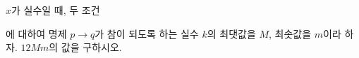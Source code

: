 $x$가 실수일 때, 두 조건 \par\smallskip{}\par\smallskip\noindent 에 대하여 명제 $p\longrightarrow q$가 참이 되도록 하는 실수 $k$의 최댓값을 $M$, 최솟값을 $m$이라 하자. $12Mm$의 값을 구하시오.
